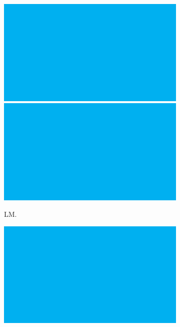 \begin{figure}[h!]
  \centering
  \begin{subfigure}[b]{0.24\columnwidth}
    \centering
    \includegraphics[width=1\textwidth]{fig/fig1.pdf}\\
    \includegraphics[width=1\textwidth]{fig/fig1.pdf}
    \caption{LM.}
    \label{fig:grid-left-most}
  \end{subfigure}
  \begin{subfigure}[b]{0.24\columnwidth}
    \centering
    \includegraphics[width=1\textwidth]{fig/fig1.pdf}\\

\end{subfigure}
\end{figure}
